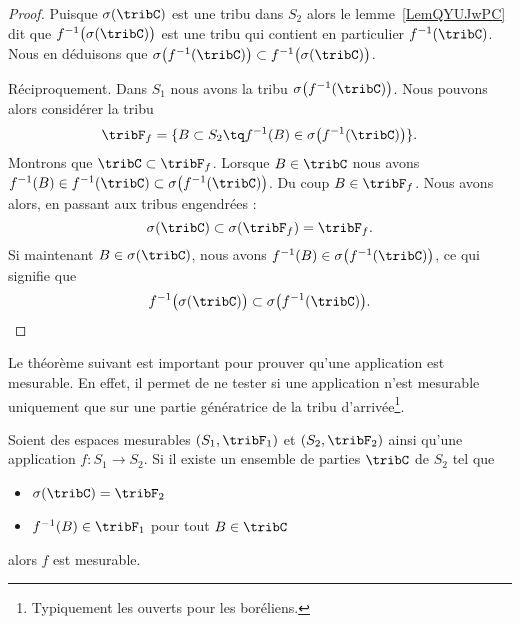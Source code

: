 \begin{proof}
	Puisque \( \sigma(\tribC)\) est une tribu dans \( S_2\) alors le lemme~\ref{LemQYUJwPC} dit que \( f^{-1}\big( \sigma(\tribC) \big)\) est une tribu qui contient en particulier \(  f^{-1}(\tribC) \). Nous en déduisons que \( \sigma\big( f^{-1}(\tribC) \big)\subset f^{-1}\big( \sigma(\tribC) \big)\).

	Réciproquement. Dans \( S_1\) nous avons la tribu \( \sigma\big( f^{-1}(\tribC) \big)\). Nous pouvons alors considérer la tribu
	\begin{equation}
		\tribF_f=\{ B\subset S_2\tq f^{-1}(B)\in\sigma\big( f^{-1}(\tribC) \big) \}.
	\end{equation}
	Montrons que \( \tribC\subset \tribF_f\). Lorsque \( B\in \tribC\) nous avons \( f^{-1}(B)\in f^{-1}(\tribC)\subset\sigma\big( f^{-1}(\tribC) \big)\). Du coup \( B\in \tribF_f\). Nous avons alors, en passant aux tribus engendrées :
	\begin{equation}
		\sigma(\tribC)\subset\sigma(\tribF_f)=\tribF_f.
	\end{equation}
	Si maintenant \( B\in\sigma(\tribC)\), nous avons \( f^{-1}(B)\in \sigma\big( f^{-1}(\tribC) \big)\), ce qui signifie que
	\begin{equation}
		f^{-1}\big( \sigma(\tribC) \big)\subset\sigma\big( f^{-1}(\tribC) \big).
	\end{equation}
\end{proof}

Le théorème suivant est important pour prouver qu'une application est mesurable. En effet, il permet de ne tester si une application n'est mesurable uniquement que sur une partie génératrice de la tribu d'arrivée\footnote{Typiquement les ouverts pour les boréliens.}.
\begin{theorem}     \label{ThoECVAooDUxZrE}
	Soient des espaces mesurables \( ( S_1,\tribF_1 )\) et \( (S_2,\tribF_2)\) ainsi qu'une application \( f\colon S_1\to S_2\). Si il existe un ensemble de parties \( \tribC\) de \( S_2\) tel que
	\begin{itemize}
		\item \( \sigma(\tribC)=\tribF_2\)
		\item \( f^{-1}(B) \in \tribF_1 \) pour tout \( B\in \tribC\)
	\end{itemize}
	alors \( f\) est mesurable.
\end{theorem}

